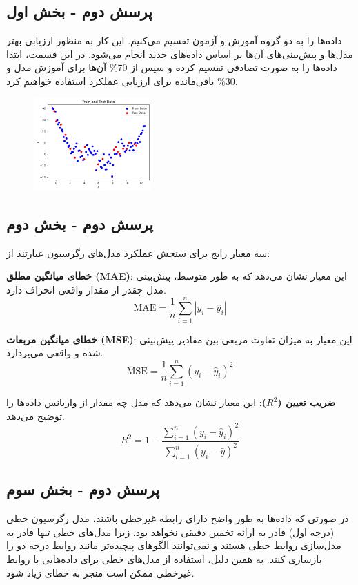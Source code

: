 \documentclass{article}
\begin{document}
\subsection{پرسش دوم - بخش اول}
داده‌ها را به دو گروه آموزش و آزمون تقسیم می‌کنیم. این کار به منظور ارزیابی بهتر مدل‌ها و پیش‌بینی‌های آن‌ها بر اساس داده‌های جدید انجام می‌شود. در این قسمت، ابتدا داده‌ها را به صورت تصادفی تقسیم کرده و سپس از 70\% آن‌ها برای آموزش مدل و 30\% باقی‌مانده برای ارزیابی عملکرد استفاده خواهیم کرد.

\begin{figure}[!h]
    \centering
    \includegraphics[width=0.4\textwidth]{img/5.png}
\end{figure}

\subsection{پرسش دوم - بخش دوم}
سه معیار رایج برای سنجش عملکرد مدل‌های رگرسیون عبارتند از:

\textbf{خطای میانگین مطلق (MAE)}: این معیار نشان می‌دهد که به طور متوسط، پیش‌بینی مدل چقدر از مقدار واقعی انحراف دارد.
\[
\text{MAE} = \frac{1}{n} \sum_{i=1}^{n} \left| y_i - \hat{y}_i \right|
\]

\textbf{خطای میانگین مربعات (MSE)}: این معیار به میزان تفاوت مربعی بین مقادیر پیش‌بینی شده و واقعی می‌پردازد.
\[
\text{MSE} = \frac{1}{n} \sum_{i=1}^{n} (y_i - \hat{y}_i)^2
\]

\textbf{ضریب تعیین ($R^2$)}: این معیار نشان می‌دهد که مدل چه مقدار از واریانس داده‌ها را توضیح می‌دهد.
\[
R^2 = 1 - \frac{\sum_{i=1}^{n} (y_i - \hat{y}_i)^2}{\sum_{i=1}^{n} (y_i - \bar{y})^2}
\]

\subsection{پرسش دوم - بخش سوم}
در صورتی که داده‌ها به طور واضح دارای رابطه غیرخطی باشند، مدل رگرسیون خطی (درجه اول) قادر به ارائه تخمین دقیقی نخواهد بود. زیرا مدل‌های خطی تنها قادر به مدل‌سازی روابط خطی هستند و نمی‌توانند الگوهای پیچیده‌تر مانند روابط درجه دو را بازسازی کنند. به همین دلیل، استفاده از مدل‌های خطی برای داده‌هایی با روابط غیرخطی ممکن است منجر به خطای زیاد شود.
\end{document}
